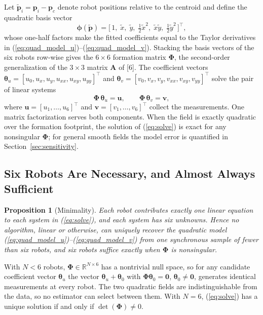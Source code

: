 \documentclass[lettersize,journal]{IEEEtran}
\newtheorem{proposition}{Proposition}
\begin{document}
Let $\tilde{\mathbf{p}}_i = \mathbf{p}_i - \mathbf{p}_c$ denote robot
positions relative to the centroid and define the quadratic basis vector
\begin{equation}
    \boldsymbol{\phi}(\tilde{\mathbf{p}}) =
    \bigl[\,1, \; \tilde{x}, \; \tilde{y}, \; \tfrac{1}{2}\tilde{x}^2, \;
    \tilde{x}\tilde{y}, \; \tfrac{1}{2}\tilde{y}^2\,\bigr]^\top,
    \label{eq:basis}
\end{equation}
whose one-half factors make the fitted coefficients equal to the Taylor
derivatives in (\ref{eq:quad_model_u})--(\ref{eq:quad_model_v}). Stacking
the basis vectors of the six robots row-wise gives the $6 \times 6$
formation matrix $\boldsymbol{\Phi}$, the second-order generalization of
the $3 \times 3$ matrix $\mathbf{A}$ of [6]. The coefficient vectors
$\boldsymbol{\theta}_u = [u_0, u_x, u_y, u_{xx}, u_{xy}, u_{yy}]^\top$ and
$\boldsymbol{\theta}_v = [v_0, v_x, v_y, v_{xx}, v_{xy}, v_{yy}]^\top$
solve the pair of linear systems
\begin{equation}
    \boldsymbol{\Phi}\,\boldsymbol{\theta}_u = \mathbf{u}, \qquad
    \boldsymbol{\Phi}\,\boldsymbol{\theta}_v = \mathbf{v},
    \label{eq:solve}
\end{equation}
where $\mathbf{u} = [u_1, \ldots, u_6]^\top$ and $\mathbf{v} = [v_1,
\ldots, v_6]^\top$ collect the measurements. One matrix factorization
serves both components. When the field is exactly quadratic over the
formation footprint, the solution of (\ref{eq:solve}) is exact for any
nonsingular $\boldsymbol{\Phi}$; for general smooth fields the model
error is quantified in Section~\ref{sec:sensitivity}.

\subsection{Six Robots Are Necessary, and Almost Always Sufficient}

\begin{proposition}[Minimality]
\label{prop:minimality}
Each robot contributes exactly one linear equation to each system in
(\ref{eq:solve}), and each system has six unknowns. Hence no algorithm,
linear or otherwise, can uniquely recover the quadratic model
(\ref{eq:quad_model_u})--(\ref{eq:quad_model_v}) from one synchronous
sample of fewer than six robots, and six robots suffice exactly when
$\boldsymbol{\Phi}$ is nonsingular.
\end{proposition}

\begin{IEEEproof}
With $N < 6$ robots, $\boldsymbol{\Phi} \in \mathbb{R}^{N \times 6}$ has
a nontrivial null space, so for any candidate coefficient vector
$\boldsymbol{\theta}_u$ the vector $\boldsymbol{\theta}_u +
\boldsymbol{\theta}_0$ with $\boldsymbol{\Phi}\boldsymbol{\theta}_0 =
\mathbf{0}$, $\boldsymbol{\theta}_0 \neq \mathbf{0}$, generates identical
measurements at every robot. The two quadratic fields are
indistinguishable from the data, so no estimator can select between
them. With $N = 6$, (\ref{eq:solve}) has a unique solution if and only if
$\det(\boldsymbol{\Phi}) \neq 0$.
\end{IEEEproof}
\end{document}
